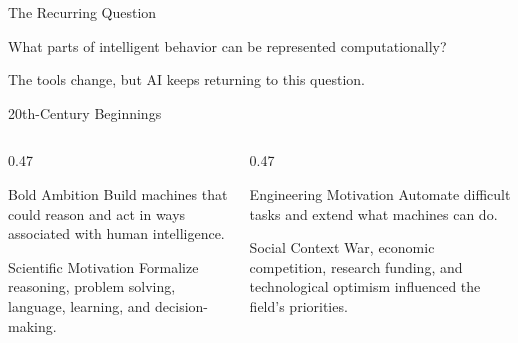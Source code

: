 \documentclass[aspectratio=169]{beamer}
\begin{document}
\begin{frame}{The Recurring Question}
  \begin{center}
    {\Huge What parts of intelligent behavior can be represented computationally?}
  \end{center}
  \vspace{0.16in}
  \begin{keyidea}
    The tools change, but AI keeps returning to this question.
  \end{keyidea}
\end{frame}

\begin{frame}{20th-Century Beginnings}
  \begin{columns}[T,onlytextwidth]
    \begin{column}{0.47\textwidth}
      \begin{block}{Bold Ambition}
        Build machines that could reason and act in ways associated with human intelligence.
      \end{block}
      \begin{block}{Scientific Motivation}
        Formalize reasoning, problem solving, language, learning, and decision-making.
      \end{block}
    \end{column}
    \begin{column}{0.47\textwidth}
      \begin{block}{Engineering Motivation}
        Automate difficult tasks and extend what machines can do.
      \end{block}
      \begin{block}{Social Context}
        War, economic competition, research funding, and technological optimism influenced the field's priorities.
      \end{block}
    \end{column}
  \end{columns}
\end{frame}
\end{document}
